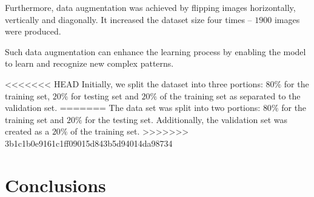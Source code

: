 \documentclass[preprint,9pt]{elsarticle}
\begin{document}
	Furthermore, data augmentation was achieved by flipping images horizontally, vertically and diagonally. 
	It increased the dataset size four times -- \(1900\) images were produced.
	
	Such data augmentation can enhance the learning process by enabling the model to learn and recognize new complex patterns.
	
<<<<<<< HEAD
	Initially, we split the dataset into three portions: \(80\%\) for the training set, \(20\%\) for testing set and \(20\%\) of the training set as separated to the validation set.
=======
	The data set was split into two portions:  \(80\%\) for the training set and \(20\%\) for the testing set.
	Additionally, the validation set was created as a \(20\%\) of the training set.
>>>>>>> 3b1c1b0e9161c1ff09015d843b5d94014da98734
	
	
	
	\section{Conclusions}



	\section*{}

	
	\section*{ }
	
	
	
	
\end{document}

